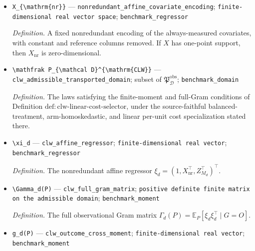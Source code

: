 \documentclass{article}
\begin{document}
\begin{itemize}
  \par\smallskip\noindent\emph{Definition.} The deterministically tie-broken minimizer of \(\widehat R_{d,m}^A\) over the admissible family.
  \item \texttt{X\_\allowbreak{}\{\textbackslash{}\allowbreak{}mathrm\{nr\}\allowbreak{}\}\allowbreak{}} --- \texttt{nonredundant\_\allowbreak{}affine\_\allowbreak{}covariate\_\allowbreak{}encoding}; \texttt{finite-\allowbreak{}dimensional real vector space}; \texttt{benchmark\_\allowbreak{}regressor}
  \par\smallskip\noindent\emph{Definition.} A fixed nonredundant encoding of the always-measured covariates, with constant and reference columns removed. If \(X\) has one-point support, then \(X_{\mathrm{nr}}\) is zero-dimensional.
  \item \texttt{\textbackslash{}\allowbreak{}mathfrak P\_\allowbreak{}\{\textbackslash{}\allowbreak{}mathcal D\}\allowbreak{}\textasciicircum{}\{\textbackslash{}\allowbreak{}mathrm\{CLW\}\allowbreak{}\}\allowbreak{}} --- \texttt{clw\_\allowbreak{}admissible\_\allowbreak{}transported\_\allowbreak{}domain}; subset of \(\mathfrak P_{\mathcal D}^{\mathrm{obs}}\); \texttt{benchmark\_\allowbreak{}domain}
  \par\smallskip\noindent\emph{Definition.} The laws satisfying the finite-moment and full-Gram conditions of Definition \(\mathrm{def{:}clw\text{-}linear\text{-}cost\text{-}selector}\), under the source-faithful balanced-treatment, arm-homoskedastic, and linear per-unit cost specialization stated there.
  \item \texttt{\textbackslash{}\allowbreak{}xi\_\allowbreak{}d} --- \texttt{clw\_\allowbreak{}affine\_\allowbreak{}regressor}; \texttt{finite-\allowbreak{}dimensional real vector}; \texttt{benchmark\_\allowbreak{}regressor}
  \par\smallskip\noindent\emph{Definition.} The nonredundant affine regressor \(\xi_d=(1,X_{\mathrm{nr}}^\top,Z_{M_d}^\top)^\top\).
  \item \texttt{\textbackslash{}\allowbreak{}Gamma\_\allowbreak{}d(P)} --- \texttt{clw\_\allowbreak{}full\_\allowbreak{}gram\_\allowbreak{}matrix}; \texttt{positive definite finite matrix on the admissible domain}; \texttt{benchmark\_\allowbreak{}moment}
  \par\smallskip\noindent\emph{Definition.} The full observational Gram matrix \(\Gamma_d(P)=\mathbb E_P[\xi_d\xi_d^\top\mid G=O]\).
  \item \texttt{g\_\allowbreak{}d(P)} --- \texttt{clw\_\allowbreak{}outcome\_\allowbreak{}cross\_\allowbreak{}moment}; \texttt{finite-\allowbreak{}dimensional real vector}; \texttt{benchmark\_\allowbreak{}moment}

\end{itemize}
\end{document}
